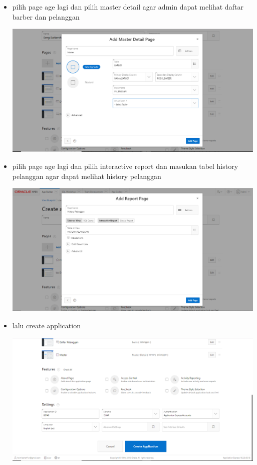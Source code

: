 ﻿\documentclass{article}
\begin{document}
\begin{itemize}
        \item pilih page age lagi dan pilih master detail agar admin dapat melihat daftar barber dan pelanggan
        \begin{center}
            \centering
            \includegraphics[scale=0.3]{gambar/15.PNG}
        \end{center}
        

        \item pilih page age lagi dan pilih interactive report dan masukan tabel history pelanggan agar dapat melihat history pelanggan
        \begin{center}
            \centering
            \includegraphics[scale=0.3]{gambar/22.PNG}
        \end{center}
        
        \item lalu create application
        \begin{center}
            \centering
            \includegraphics[scale=0.3]{gambar/16.PNG}
        \end{center}
        

\end{itemize}
\end{document}
